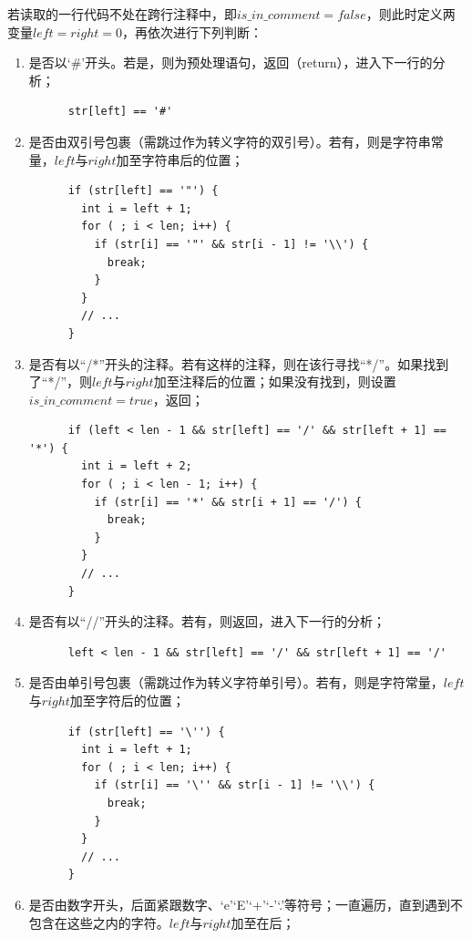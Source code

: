 \documentclass[11pt]{homework}
\begin{document}
  若读取的一行代码不处在跨行注释中，即$is\_in\_comment = false$，则此时定义两变量$left = right = 0$，再依次进行下列判断：
  \begin{enumerate}
    \item 是否以‘\#’开头。若是，则为预处理语句，返回（return），进入下一行的分析；
    \lstset{language=c++}
    \begin{lstlisting}
      str[left] == '#'
    \end{lstlisting}
    \item 是否由双引号包裹（需跳过作为转义字符的双引号）。若有，则是字符串常量，$left$与$right$加至字符串后的位置；
    \lstset{language=c++}
    \begin{lstlisting}
      if (str[left] == '"') {
        int i = left + 1;
        for ( ; i < len; i++) {
          if (str[i] == '"' && str[i - 1] != '\\') {
            break;
          }
        }
        // ...
      }
    \end{lstlisting}
    \item 是否有以“/*”开头的注释。若有这样的注释，则在该行寻找“*/”。如果找到了“*/”，则$left$与$right$加至注释后的位置；如果没有找到，则设置$is\_in\_comment = true$，返回；
    \lstset{language=c++}
    \begin{lstlisting}
      if (left < len - 1 && str[left] == '/' && str[left + 1] == '*') {
        int i = left + 2;
        for ( ; i < len - 1; i++) {
          if (str[i] == '*' && str[i + 1] == '/') {
            break;
          }
        }
        // ...
      }
    \end{lstlisting}
    \item 是否有以“//”开头的注释。若有，则返回，进入下一行的分析；
    \lstset{language=c++}
    \begin{lstlisting}
      left < len - 1 && str[left] == '/' && str[left + 1] == '/'
    \end{lstlisting}
    \item 是否由单引号包裹（需跳过作为转义字符单引号）。若有，则是字符常量，$left$与$right$加至字符后的位置；
    \lstset{language=c++}
    \begin{lstlisting}
      if (str[left] == '\'') {
        int i = left + 1;
        for ( ; i < len; i++) {
          if (str[i] == '\'' && str[i - 1] != '\\') {
            break;
          }
        }
        // ...
      }
    \end{lstlisting}
    \item 是否由数字开头，后面紧跟数字、‘e’‘E’‘+’‘-’‘.’等符号；一直遍历，直到遇到不包含在这些之内的字符。$left$与$right$加至在后；

\end{enumerate}
\end{document}
